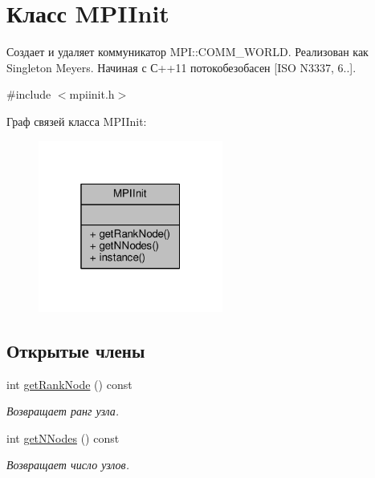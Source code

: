\hypertarget{classMPIInit}{\section{Класс M\-P\-I\-Init}
\label{classMPIInit}
}


Создает и удаляет коммуникатор M\-P\-I\-::\-C\-O\-M\-M\-\_\-\-W\-O\-R\-L\-D. Реализован как Singleton Meyers. Начиная с С++11 потокобезобасен \mbox{[}I\-S\-O N3337, 6..\mbox{]}.  




{\ttfamily \#include $<$mpiinit.\-h$>$}



Граф связей класса M\-P\-I\-Init\-:\nopagebreak
\begin{figure}[H]
\begin{center}
\leavevmode
\includegraphics[width=172pt]{classMPIInit__coll__graph}
\end{center}
\end{figure}
\subsection*{Открытые члены}
\begin{DoxyCompactItemize}
\item 
int \hyperlink{classMPIInit_ab84a17bc15db203a84e91809402b3de7}{get\-Rank\-Node} () const 
\begin{DoxyCompactList}\small\item\em Возвращает ранг узла. \end{DoxyCompactList}\item 
int \hyperlink{classMPIInit_a2fcb15c25a142749bfdc475925543e9c}{get\-N\-Nodes} () const 
\begin{DoxyCompactList}\small\item\em Возвращает число узлов. \end{DoxyCompactList}\end{DoxyCompactItemize}
